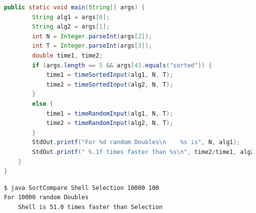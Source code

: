 \documentclass[8pt,a4paper,compress]{beamer}
\begin{document}
\begin{frame}[fragile]
\pause

\begin{lstlisting}[language=Java,style=focusin]
    public static void main(String[] args) { 
        String alg1 = args[0]; 
        String alg2 = args[1]; 
        int N = Integer.parseInt(args[2]);
        int T = Integer.parseInt(args[3]);
        double time1, time2;
        if (args.length == 5 && args[4].equals("sorted")) {
            time1 = timeSortedInput(alg1, N, T);
            time2 = timeSortedInput(alg2, N, T);
        }
        else {
            time1 = timeRandomInput(alg1, N, T);
            time2 = timeRandomInput(alg2, N, T);
        }
        StdOut.printf("For %d random Doubles\n    %s is", N, alg1); 
        StdOut.printf(" %.1f times faster than %s\n", time2/time1, alg2); 
    } 
}
\end{lstlisting}

\pause\bigskip

\begin{lstlisting}[language={},style=focusin]
$ java SortCompare Shell Selection 10000 100
For 10000 random Doubles
    Shell is 51.0 times faster than Selection
\end{lstlisting}
\end{frame}
\end{document}
